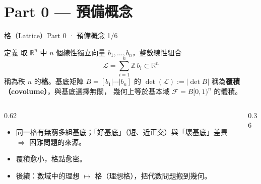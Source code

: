 \documentclass[aspectratio=169, 11pt]{beamer}
\newcommand{\R}{\mathbb{R}}
\newcommand{\Z}{\mathbb{Z}}
\begin{document}
\section{Part 0 — 預備概念}

\begin{frame}{格（Lattice）}{Part 0 · 預備概念 1/6}
  \begin{block}{定義}
    取 $\R^n$ 中 $n$ 個線性獨立向量 $b_1,\dots,b_n$，整數線性組合
    \[
      \mathcal{L}=\sum_{i=1}^n \Z\, b_i \subset \R^n
    \]
    稱為秩 $n$ 的\textbf{格}。基底矩陣 $B=[b_1|\cdots|b_n]$ 的
    $\det(\mathcal{L}):=|\det B|$ 稱為\textbf{覆積（covolume）}，與基底選擇無關，
    幾何上等於基本域 $\mathcal{F}=B[0,1)^n$ 的體積。
  \end{block}
  \begin{columns}[c]
    \begin{column}{0.62\textwidth}
      \begin{itemize}\small
        \item 同一格有無窮多組基底；「好基底」（短、近正交）與「壞基底」差異 $\Rightarrow$ 困難問題的來源。
        \item 覆積愈小，格點愈密。
        \item 後續：數域中的理想 $\mapsto$ 格（理想格），把代數問題搬到幾何。
      \end{itemize}
    \end{column}
    \begin{column}{0.36\textwidth}
      \centering
    \end{column}
  \end{columns}
\end{frame}
\end{document}

